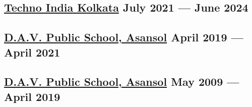 





\subsection{{\href{https://www.ticollege.ac.in/}{Techno India Kolkata} \hfill July 2021 --- June 2024}}

\begin{null}
\end{null}

\subsection{{\href{http://davpsasansol.org/}{D.A.V. Public School, Asansol} \hfill April 2019 --- April 2021}}
\begin{null}

\end{null}

\subsection{{\href{http://davpsasansol.org/}{D.A.V. Public School, Asansol} \hfill May 2009 --- April 2019}}
\begin{null}

\end{null}